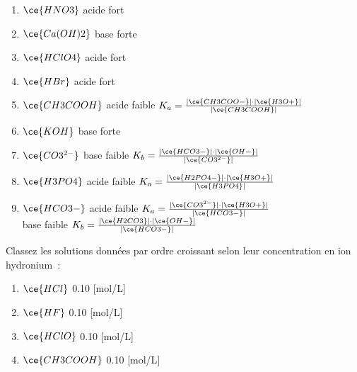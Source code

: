 \documentclass[
  11pt,
  a4paper,
  openany]{book}
\providecommand{\tightlist}{%
  \setlength{\itemsep}{0pt}\setlength{\parskip}{0pt}}
\begin{document}
\begin{Answer}

\begin{enumerate}
\def\labelenumi{\alph{enumi}.}
\tightlist
\item
  \(\ce{HNO3}\) \tabto{8em} acide fort
  \vspace{1em}
\item
  \(\ce{Ca(OH)2}\) \tabto{8em} base forte
  \vspace{1em}
\item
  \(\ce{HClO4}\) \tabto{8em} acide fort
  \vspace{1em}
\item
  \(\ce{HBr}\) \tabto{8em} acide fort
  \vspace{1em}
\item
  \(\ce{CH3COOH}\) \tabto{8em} acide faible \tabto{16em} \(K_a = \frac{|\ce{CH3COO-}| \cdot |\ce{H3O+}|}{|\ce{CH3COOH}|}\)
  \vspace{1em}
\item
  \(\ce{KOH}\) \tabto{8em} base forte
  \vspace{1em}
\item
  \(\ce{CO3^{2-}}\) \tabto{8em} base faible \tabto{16em} \(K_b = \frac{|\ce{HCO3-}| \cdot |\ce{OH-}|}{|\ce{CO3^{2-}}|}\)
  \vspace{1em}
\item
  \(\ce{H3PO4}\) \tabto{8em} acide faible \tabto{16em} \(K_a = \frac{|\ce{H2PO4-}| \cdot |\ce{H3O+}|}{|\ce{H3PO4}|}\)
  \vspace{1em}
\item
  \(\ce{HCO3-}\) \tabto{8em} acide faible \tabto{16em} \(K_a = \frac{|\ce{CO3^{2-}}| \cdot |\ce{H3O+}|}{|\ce{HCO3-}|}\)\\
  \vspace{1em}
  \tabto{8em} base faible \tabto{16em} \(K_b = \frac{|\ce{H2CO3}| \cdot |\ce{OH-}|}{|\ce{HCO3-}|}\)
\end{enumerate}

\end{Answer}

\begin{Exercise}

Classez les solutions données par ordre croissant selon leur concentration en ion hydronium~:

\begin{enumerate}
\def\labelenumi{\alph{enumi}.}
\tightlist
\item
  \(\ce{HCl}\) 0.10 {[}mol/L{]}
\item
  \(\ce{HF}\) 0.10 {[}mol/L{]}
\item
  \(\ce{HClO}\) 0.10 {[}mol/L{]}
\item
  \(\ce{CH3COOH}\) 0.10 {[}mol/L{]}
\end{enumerate}

\end{Exercise}
\end{document}
